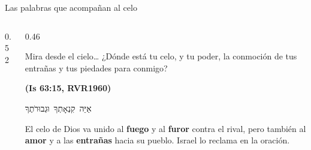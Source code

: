 \documentclass[hyperref={bookmarks=false},aspectratio=169]{beamer}
\newcommand{\heb}[1]{\mbox{\foreignlanguage{hebrew}{#1}}}
\newcommand{\fuente}[1]{\par\hfill{\upshape\bfseries\footnotesize\textcolor{azul}{#1}}}
\newcommand{\destacar}[1]{\textbf{\textcolor{azul}{#1}}}
\begin{document}
\begin{frame}{Las palabras que acompañan al celo}
\begin{columns}[c,onlytextwidth]
\begin{column}{0.52\textwidth}
\centering
{}
\end{column}
\begin{column}{0.46\textwidth}
\begin{cita}Mira desde el cielo\ldots{} ¿Dónde está tu celo, y tu poder, la conmoción de tus entrañas y tus piedades para conmigo?\fuente{(Is 63:15, RVR1960)}\end{cita}
\begin{center}\heb{אַיֵּה קִנְאָתְךָ וּגְבוּרֹתֶךָ}\end{center}
\small El celo de Dios va unido al \destacar{fuego} y al \destacar{furor} contra el rival, pero también al \destacar{amor} y a las \destacar{entrañas} hacia su pueblo. Israel lo reclama en la oración.
\end{column}
\end{columns}
\end{frame}
\end{document}
